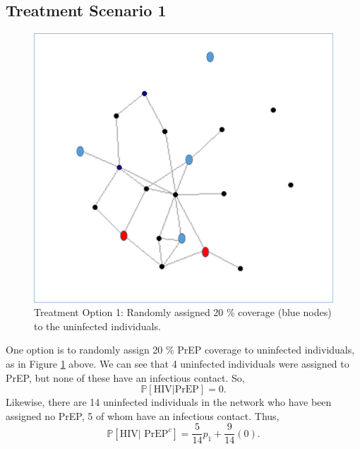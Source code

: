 \documentclass{article}
\theoremstyle{definition}
\begin{document}
\subsection{Treatment Scenario 1} 
\begin{figure}[H]
    \centering
    \includegraphics[scale=0.5]{Figures/Network Example 3.png}
    \caption{Treatment Option 1: Randomly assigned 20 \% coverage (blue nodes) to the uninfected individuals.}
    \label{fig:Figure 4}
\end{figure}

One option is to randomly assign 20 \% PrEP coverage to uninfected individuals, as in Figure \ref{fig:Figure 4} above.
We can see that 4 uninfected individuals were assigned to PrEP, but none of these have an infectious contact. So, $$\mathbb{P}\left[\text{HIV}\vert \text{PrEP} \right]=0.$$ Likewise, there are 14 uninfected individuals in the network who have been assigned no PrEP, 5 of whom have an infectious contact. Thus, $$\mathbb{P}\left[\text{HIV} \vert \text{ PrEP}^{c}\right]=\frac{5}{14}p_{1}+\frac{9}{14}\left(0\right).$$  
\end{document}
